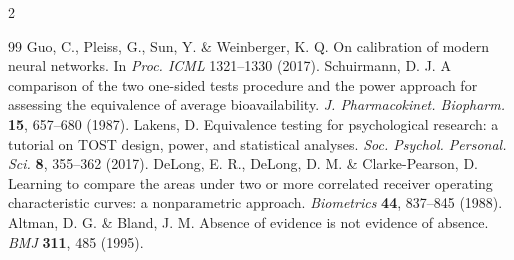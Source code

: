 \documentclass[10pt,a4paper,twoside]{article}
\begin{document}
\begin{multicols}{2}
\begin{thebibliography}{99}
 Guo, C., Pleiss, G., Sun, Y. \& Weinberger, K. Q. On calibration of modern neural networks. In \textit{Proc. ICML} 1321--1330 (2017).
 Schuirmann, D. J. A comparison of the two one-sided tests procedure and the power approach for assessing the equivalence of average bioavailability. \textit{J. Pharmacokinet. Biopharm.} \textbf{15}, 657--680 (1987).
 Lakens, D. Equivalence testing for psychological research: a tutorial on TOST design, power, and statistical analyses. \textit{Soc. Psychol. Personal. Sci.} \textbf{8}, 355--362 (2017).
 DeLong, E. R., DeLong, D. M. \& Clarke-Pearson, D. Learning to compare the areas under two or more correlated receiver operating characteristic curves: a nonparametric approach. \textit{Biometrics} \textbf{44}, 837--845 (1988).
 Altman, D. G. \& Bland, J. M. Absence of evidence is not evidence of absence. \textit{BMJ} \textbf{311}, 485 (1995).
\end{thebibliography}

\end{multicols}
\end{document}
